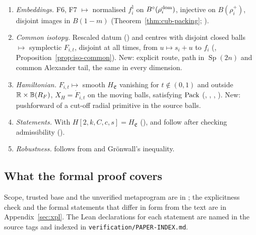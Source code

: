 \begin{enumerate}[label=\textbf{F\arabic*},leftmargin=*,itemsep=3pt]
\item \emph{Embeddings.} F6, F7 $\mapsto$ normalised $f^\natural_i$ on $B^{\circ}(\rho_i^{\rm dom})$, injective on $B(\rho_i^+)$, disjoint images in $B(1-m)$ (Theorem~\ref{thm:cub-packing}; ).
\item \emph{Common isotopy.} Rescaled datum () and centres with disjoint closed balls $\mapsto$ symplectic $F_{i,t}$, disjoint at all times, from $u\mapsto s_i+u$ to $f_i$ (, Proposition~\ref{prop:iso-common}). New: explicit route, path in $\operatorname{Sp}(2n)$ and common Alexander tail, the same in every dimension.
\item \emph{Hamiltonian.} $F_{i,t}\mapsto$ smooth $H_{\mathfrak E}$ vanishing for $t\notin(0,1)$ and outside $\mathbb{R}\times\mathbb{B}(R_F)$, $X_H=\dot F_{i,t}$ on the moving balls, satisfying $\mathrm{Pack}$ (, , , ). New: pushforward of a cut-off radial primitive in the source balls.
\item \emph{Statements.} With $H[2,k,C,c,s]=H_{\mathfrak E}$ (),  and  follow after checking admissibility ().
\item \emph{Robustness.}  follows from  and Gr\"onwall's inequality.
\end{enumerate}

\subsection{What the formal proof covers}\label{sec:guide-trust}

Scope, trusted base and the unverified metaprogram are in ; the explicitness check and the formal statements
that differ in form from the text are in Appendix~\ref{sec:xpl}. The Lean declarations for each statement are named in
the source tags and indexed in \texttt{verification/PAPER-INDEX.md}.

\endgroup

